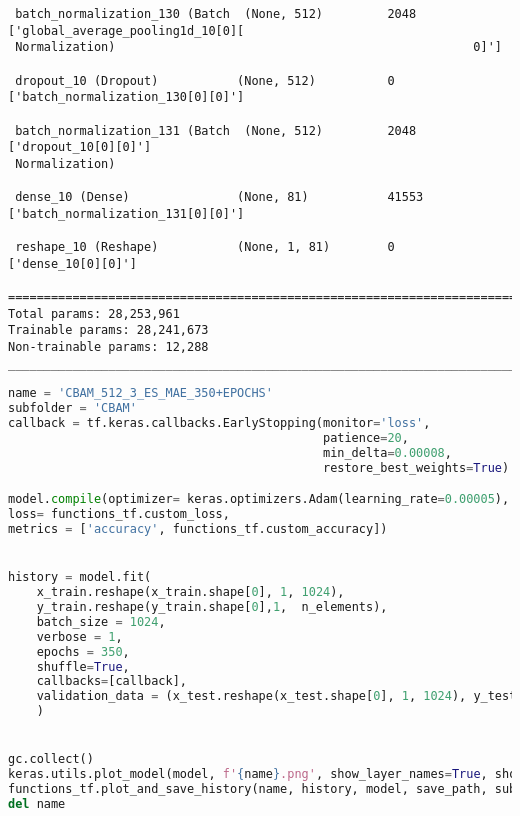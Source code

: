 \begin{lstlisting}
 batch_normalization_130 (Batch  (None, 512)         2048        ['global_average_pooling1d_10[0][
 Normalization)                                                  0]']                             
                                                                                                  
 dropout_10 (Dropout)           (None, 512)          0           ['batch_normalization_130[0][0]']
                                                                                                  
 batch_normalization_131 (Batch  (None, 512)         2048        ['dropout_10[0][0]']             
 Normalization)                                                                                   
                                                                                                  
 dense_10 (Dense)               (None, 81)           41553       ['batch_normalization_131[0][0]']
                                                                                                  
 reshape_10 (Reshape)           (None, 1, 81)        0           ['dense_10[0][0]']               
                                                                                                  
==================================================================================================
Total params: 28,253,961
Trainable params: 28,241,673
Non-trainable params: 12,288
__________________________________________________________________________________________________
\end{lstlisting}

\begin{lstlisting}[language=Python]
name = 'CBAM_512_3_ES_MAE_350+EPOCHS'
subfolder = 'CBAM'
callback = tf.keras.callbacks.EarlyStopping(monitor='loss', 
                                            patience=20,
                                            min_delta=0.00008,
                                            restore_best_weights=True)

model.compile(optimizer= keras.optimizers.Adam(learning_rate=0.00005),
loss= functions_tf.custom_loss,
metrics = ['accuracy', functions_tf.custom_accuracy])


history = model.fit(
    x_train.reshape(x_train.shape[0], 1, 1024),
    y_train.reshape(y_train.shape[0],1,  n_elements),
    batch_size = 1024,
    verbose = 1,
    epochs = 350,
    shuffle=True,
    callbacks=[callback],
    validation_data = (x_test.reshape(x_test.shape[0], 1, 1024), y_test.reshape(y_test.shape[0],1,  n_elements))
    )


gc.collect()
keras.utils.plot_model(model, f'{name}.png', show_layer_names=True, show_layer_activations=True, show_shapes=True)
functions_tf.plot_and_save_history(name, history, model, save_path, subfolder=subfolder, plot_acc=False)
del name
\end{lstlisting}

